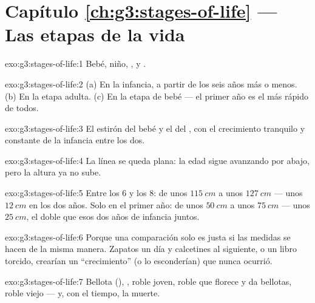\section*{Capítulo \ref{ch:g3:stages-of-life} --- Las etapas de la vida}

\begin{solution}{exo:g3:stages-of-life:1}
Bebé, niño, ,  y .
\end{solution}

\begin{solution}{exo:g3:stages-of-life:2}
(a) En la infancia, a partir de los seis años más o menos. (b) En la
etapa adulta. (c) En la etapa de bebé --- el primer año es el más
rápido de todos.
\end{solution}

\begin{solution}{exo:g3:stages-of-life:3}
El estirón del bebé y el del , con el crecimiento tranquilo
y constante de la infancia entre los dos.
\end{solution}

\begin{solution}{exo:g3:stages-of-life:4}
La línea se queda plana: la edad sigue avanzando por abajo, pero la
altura ya no sube.
\end{solution}

\begin{solution}{exo:g3:stages-of-life:5}
Entre los $6$ y los $8$: de unos $\qty{115}{cm}$ a unos
$\qty{127}{cm}$ --- unos $\qty{12}{cm}$ en los dos años. Solo en el
primer año: de unos $\qty{50}{cm}$ a unos $\qty{75}{cm}$ --- unos
$\qty{25}{cm}$, el doble que esos dos años de infancia juntos.
\end{solution}

\begin{solution}{exo:g3:stages-of-life:6}
Porque una comparación solo es justa si las medidas se hacen de la
misma manera. Zapatos un día y calcetines al siguiente, o un libro
torcido, crearían un ``crecimiento'' (o lo esconderían) que nunca
ocurrió.
\end{solution}

\begin{solution}{exo:g3:stages-of-life:7}
Bellota (), , roble joven, roble  que florece y
da bellotas, roble viejo --- y, con el tiempo, la muerte.
\end{solution}

